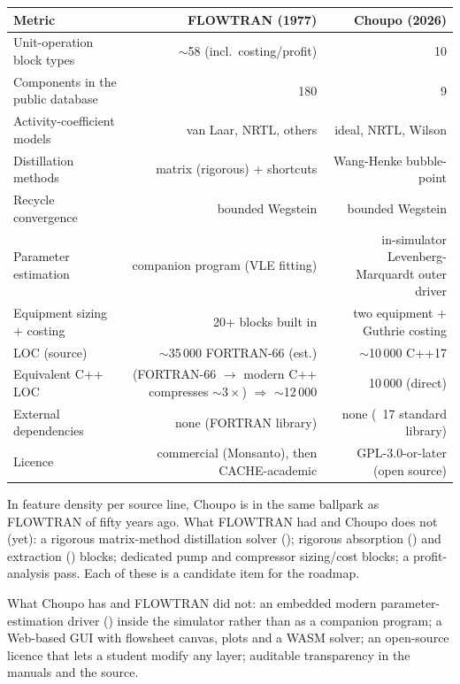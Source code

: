 \documentclass[11pt,a4paper]{article}
\begin{document}
\begin{center}\small
\begin{tabularx}{\linewidth}{@{}Xrr@{}}
\toprule
\textbf{Metric}                       & \textbf{FLOWTRAN (1977)} & \textbf{Choupo (2026)} \\
\midrule
Unit-operation block types            & $\sim$58 (incl.\ costing/profit) & 10 \\
Components in the public database     & 180                              & 9 \\
Activity-coefficient models           & van Laar, NRTL, others           & ideal, NRTL, Wilson \\
Distillation methods                  & matrix (rigorous) + shortcuts    & Wang-Henke bubble-point \\
Recycle convergence                   & bounded Wegstein                 & bounded Wegstein \\
Parameter estimation                  & companion program (VLE fitting)  & in-simulator Levenberg-Marquardt outer driver \\
Equipment sizing + costing            & 20+ blocks built in              & two equipment + Guthrie costing \\
LOC (source)                          & $\sim$35\,000 FORTRAN-66 (est.)  & $\sim$10\,000 C++17 \\
Equivalent C++ LOC                    & (FORTRAN-66 $\to$ modern C++ compresses $\sim 3\!\times$) $\Rightarrow$ $\sim$12\,000 & 10\,000 (direct) \\
External dependencies                 & none (FORTRAN library)           & none (\cpp{}~17 standard library) \\
Licence                               & commercial (Monsanto), then CACHE-academic & GPL-3.0-or-later (open source) \\
\bottomrule
\end{tabularx}
\end{center}

In feature density per source line, Choupo is in the same
ballpark as FLOWTRAN of fifty years ago.  What FLOWTRAN had and
Choupo does not (yet): a rigorous matrix-method distillation
solver (); rigorous absorption () and
extraction () blocks; dedicated pump and compressor
sizing/cost blocks; a profit-analysis pass.  Each of these is a
candidate item for the roadmap.

What Choupo has and FLOWTRAN did not: an embedded modern
parameter-estimation driver () inside the
simulator rather than as a companion program; a Web-based GUI with
flowsheet canvas, plots and a WASM solver; an open-source licence
that lets a student modify any layer; auditable transparency in the
manuals and the source.
\end{document}
